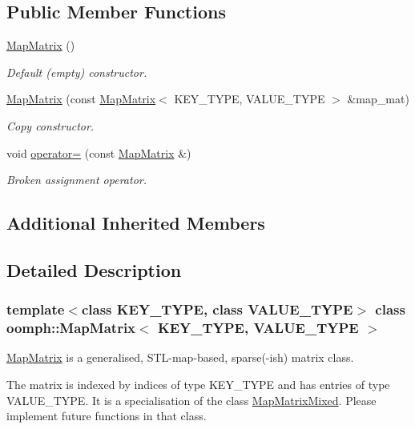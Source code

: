 \subsection*{Public Member Functions}
\begin{DoxyCompactItemize}
\item 
\hyperlink{classoomph_1_1MapMatrix_a52ace9b2ef78f96cebbe3b6e2173a87c}{Map\+Matrix} ()
\begin{DoxyCompactList}\small\item\em Default (empty) constructor. \end{DoxyCompactList}\item 
\hyperlink{classoomph_1_1MapMatrix_ac58797d44964ccff957077b74076c231}{Map\+Matrix} (const \hyperlink{classoomph_1_1MapMatrix}{Map\+Matrix}$<$ K\+E\+Y\+\_\+\+T\+Y\+PE, V\+A\+L\+U\+E\+\_\+\+T\+Y\+PE $>$ \&map\+\_\+mat)
\begin{DoxyCompactList}\small\item\em Copy constructor. \end{DoxyCompactList}\item 
void \hyperlink{classoomph_1_1MapMatrix_ad28a61f99589c46468dada134650857d}{operator=} (const \hyperlink{classoomph_1_1MapMatrix}{Map\+Matrix} \&)
\begin{DoxyCompactList}\small\item\em Broken assignment operator. \end{DoxyCompactList}\end{DoxyCompactItemize}
\subsection*{Additional Inherited Members}


\subsection{Detailed Description}
\subsubsection*{template$<$class K\+E\+Y\+\_\+\+T\+Y\+PE, class V\+A\+L\+U\+E\+\_\+\+T\+Y\+PE$>$\newline
class oomph\+::\+Map\+Matrix$<$ K\+E\+Y\+\_\+\+T\+Y\+P\+E, V\+A\+L\+U\+E\+\_\+\+T\+Y\+P\+E $>$}

\hyperlink{classoomph_1_1MapMatrix}{Map\+Matrix} is a generalised, S\+T\+L-\/map-\/based, sparse(-\/ish) matrix class.

The matrix is indexed by indices of type K\+E\+Y\+\_\+\+T\+Y\+PE and has entries of type V\+A\+L\+U\+E\+\_\+\+T\+Y\+PE. It is a specialisation of the class \hyperlink{classoomph_1_1MapMatrixMixed}{Map\+Matrix\+Mixed}. Please implement future functions in that class.

